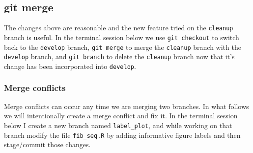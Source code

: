 \documentclass[
  letterpaper,
  DIV=11,
  numbers=noendperiod]{scrreprt}
\newenvironment{Shaded}{\begin{snugshade}}{\end{snugshade}}
\newcommand{\NormalTok}[1]{\textcolor[rgb]{0.00,0.23,0.31}{#1}}
\begin{document}
\hypertarget{git-merge}{%
\subsection{git merge}\label{git-merge}}

The changes above are reasonable and the new feature tried on the
\texttt{cleanup} branch is useful. In the terminal session below we use
\texttt{git\ checkout} to switch back to the \texttt{develop} branch,
\texttt{git\ merge} to merge the \texttt{cleanup} branch with the
\texttt{develop} branch, and \texttt{git\ branch} to delete the
\texttt{cleanup} branch now that it's change has been incorporated into
\texttt{develop}.

\begin{Shaded}
\end{Shaded}

\hypertarget{merge-conflicts}{%
\subsubsection{Merge conflicts}\label{merge-conflicts}}

Merge conflicts can occur any time we are merging two branches. In what
follows we will intentionally create a merge conflict and fix it. In the
terminal session below I create a new branch named \texttt{label\_plot},
and while working on that branch modify the file \texttt{fib\_seq.R} by
adding informative figure labels and then stage/commit those changes.
\end{document}
